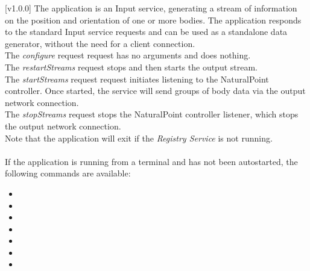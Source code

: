 [v1.0.0]
The  application is an Input service,
generating a stream of information on the position and orientation of one or more bodies.
The application responds to the standard Input service requests and can be used as a
standalone data generator, without the need for a client connection.\\

The \emph{configure} request request has no arguments and does nothing.\\

The \emph{restartStreams} request stops and then starts the output stream.\\

The \emph{startStreams} request request initiates listening to the NaturalPoint
controller.
Once started, the service will send groups of body data via the output \yarp{} network
connection.\\

The \emph{stopStreams} request stops the NaturalPoint controller listener, which stops the
output \yarp{} network connection.\\ 

Note that the application will exit if the \emph{Registry Service} is not running.\\

\insertAppParameters{}
\insertTagDescription{\NPI}
\insertInputServiceComment{}\\

If the application is running from a terminal and has not been autostarted, the following
commands are available:
\begin{itemize}
\item{}
\item\exSp{}
\item\exSp{}
\item\exSp{}
\item\exSp{}
\item\exSp{}
\item\exSp{}
\end{itemize}
\primaryEnd{}
